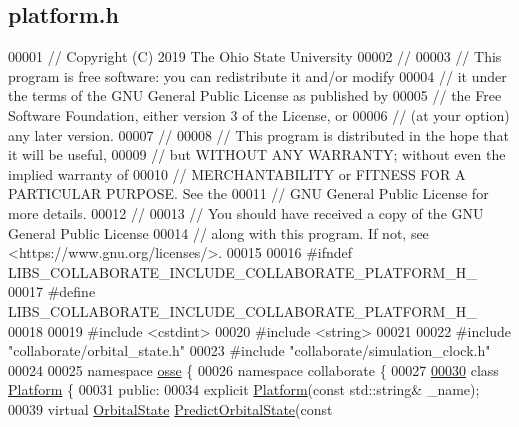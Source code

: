 \hypertarget{platform_8h_source}{}\subsection{platform.\+h}
\label{platform_8h_source}

\begin{DoxyCode}
00001 \textcolor{comment}{// Copyright (C) 2019 The Ohio State University}
00002 \textcolor{comment}{//}
00003 \textcolor{comment}{// This program is free software: you can redistribute it and/or modify}
00004 \textcolor{comment}{// it under the terms of the GNU General Public License as published by}
00005 \textcolor{comment}{// the Free Software Foundation, either version 3 of the License, or}
00006 \textcolor{comment}{// (at your option) any later version.}
00007 \textcolor{comment}{//}
00008 \textcolor{comment}{// This program is distributed in the hope that it will be useful,}
00009 \textcolor{comment}{// but WITHOUT ANY WARRANTY; without even the implied warranty of}
00010 \textcolor{comment}{// MERCHANTABILITY or FITNESS FOR A PARTICULAR PURPOSE.  See the}
00011 \textcolor{comment}{// GNU General Public License for more details.}
00012 \textcolor{comment}{//}
00013 \textcolor{comment}{// You should have received a copy of the GNU General Public License}
00014 \textcolor{comment}{// along with this program.  If not, see <https://www.gnu.org/licenses/>.}
00015 
00016 \textcolor{preprocessor}{#ifndef LIBS\_COLLABORATE\_INCLUDE\_COLLABORATE\_PLATFORM\_H\_}
00017 \textcolor{preprocessor}{#define LIBS\_COLLABORATE\_INCLUDE\_COLLABORATE\_PLATFORM\_H\_}
00018 
00019 \textcolor{preprocessor}{#include <cstdint>}
00020 \textcolor{preprocessor}{#include <string>}
00021 
00022 \textcolor{preprocessor}{#include "collaborate/orbital\_state.h"}
00023 \textcolor{preprocessor}{#include "collaborate/simulation\_clock.h"}
00024 
00025 \textcolor{keyword}{namespace }\hyperlink{namespaceosse}{osse} \{
00026 \textcolor{keyword}{namespace }collaborate \{
00027 
\hyperlink{classosse_1_1collaborate_1_1_platform}{00030} \textcolor{keyword}{class }\hyperlink{classosse_1_1collaborate_1_1_platform}{Platform} \{
00031  \textcolor{keyword}{public}:
00034   \textcolor{keyword}{explicit} \hyperlink{classosse_1_1collaborate_1_1_platform_aca95bfbb4f84285f1767d575a3e4c2ec}{Platform}(\textcolor{keyword}{const} std::string& \_name);
00039   \textcolor{keyword}{virtual} \hyperlink{classosse_1_1collaborate_1_1_orbital_state}{OrbitalState} \hyperlink{classosse_1_1collaborate_1_1_platform_ad7070fcb9d91b22f25dbe0211ba0cc73}{PredictOrbitalState}(\textcolor{keyword}{const} 

\end{DoxyCode}
